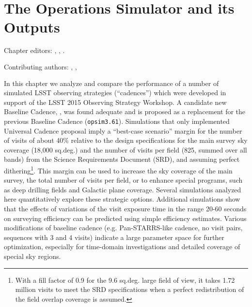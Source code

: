 
\chapter[Some Example Observing Strategies]{The Operations Simulator and its Outputs}
\def\chpname{cadexp}\label{chp:\chpname}

Chapter editors:
,
,
.

Contributing authors:
,
,


 In this chapter
we analyze and compare the performance of a number of simulated LSST
observing strategies (``cadences'')
which were developed in support of the LSST 2015 Observing
Strategy Workshop.  A candidate new Baseline Cadence,
, was found adequate and is proposed as  a
replacement for the previous Baseline Cadence (\texttt{opsim3.61}).
Simulations that only implemented Universal Cadence proposal imply a
``best-case scenario'' margin for the number of visits of about 40\% relative to the design
specifications for the main survey sky coverage (18,000 sq.deg.) and the number of
visits per field (825, summed over all bands) from the Science Requirements Document (SRD),
and assuming perfect dithering\footnote{With a fill factor of 0.9 for the 9.6 sq.deg. large
field of view, it takes 1.72 million visits to meet the SRD specifications when a perfect
redistribution of the field overlap coverage is assumed.}.
This margin can be used to increase the sky coverage of the main survey, the total
number of visits per field, or to enhance special programs, such as
deep drilling fields and Galactic plane coverage. Several  simulations
analyzed here quantitatively explore these strategic options.
Additional simulations show that the effects of variations of the
visit exposure time in the  range 20-60 seconds on surveying
efficiency can be predicted using simple efficiency estimates. Various
modifications of baseline cadence (e.g. Pan-STARRS-like cadence,  no
visit pairs, sequences with 3 and 4 visits) indicate a large parameter
space for further optimization, especially for time-domain
investigations and detailed coverage of special sky regions.

